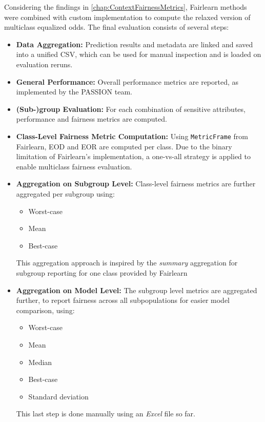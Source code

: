 \documentclass[12pt, a4paper, oneside]{book}   	%
\begin{document}
		Considering the findings in \autoref{chap:ContextFairnessMetrics}, \gls{Fairlearn} methods were combined with custom implementation to compute the relaxed version of multiclass equalized odds. The final evaluation consists of several steps:
		\begin{itemize}
			\item \textbf{Data Aggregation:} Prediction results and metadata are linked and saved into a unified CSV, which can be used for manual inspection and is loaded on evaluation reruns.
			\item \textbf{General Performance:} Overall performance metrics are reported, as implemented by the PASSION team.
			\item \textbf{(Sub-)group Evaluation:} For each combination of sensitive attributes, performance and fairness metrics are computed.
			\item \textbf{Class-Level Fairness Metric Computation:} Using \texttt{MetricFrame} from \gls{Fairlearn}, \gls{EOD} and \gls{EOR} are computed per class. Due to the binary limitation of \gls{Fairlearn}'s implementation, a one-vs-all strategy is applied to enable multiclass fairness evaluation.
			\item \textbf{Aggregation on Subgroup Level:} Class-level fairness metrics are further aggregated per subgroup using:
			\begin{itemize}
				\item Worst-case
				\item Mean
				\item Best-case
			\end{itemize}
			This aggregation approach is inspired by the \textit{summary} aggregation for subgroup reporting for one class provided by \gls{Fairlearn} \autocite{Fairlearn_nodate}
			\item \textbf{Aggregation on Model Level:} The subgroup level metrics are aggregated further, to report fairness across all subpopulations for easier model comparison, using:
			\begin{itemize}
				\item Worst-case
				\item Mean
				\item Median
				\item Best-case
				\item Standard deviation
			\end{itemize}
			This last step is done manually using an \textit{Excel} file so far.
		\end{itemize}
		
\end{document}
